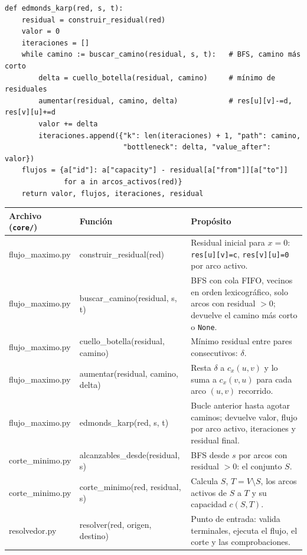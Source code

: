 \documentclass[12pt, a4paper]{article}
\begin{document}
\begin{lstlisting}
def edmonds_karp(red, s, t):
    residual = construir_residual(red)
    valor = 0
    iteraciones = []
    while camino := buscar_camino(residual, s, t):   # BFS, camino más corto
        delta = cuello_botella(residual, camino)     # mínimo de residuales
        aumentar(residual, camino, delta)            # res[u][v]-=d, res[v][u]+=d
        valor += delta
        iteraciones.append({"k": len(iteraciones) + 1, "path": camino,
                            "bottleneck": delta, "value_after": valor})
    flujos = {a["id"]: a["capacity"] - residual[a["from"]][a["to"]]
              for a in arcos_activos(red)}
    return valor, flujos, iteraciones, residual
\end{lstlisting}

\begin{table}[H]
  \centering
  \small
  \begin{tabular}{>{\ttfamily\raggedright\arraybackslash}p{3.0cm}>{\ttfamily\raggedright\arraybackslash}p{4.4cm}p{6.0cm}}
    \toprule
    \textnormal{\textbf{Archivo (\texttt{core/})}} & \textnormal{\textbf{Función}} & \textbf{Propósito} \\
    \midrule
    flujo\_maximo.py & construir\_residual(red) & Residual inicial para $x=0$: \texttt{res[u][v]=c}, \texttt{res[v][u]=0} por arco activo. \\
    flujo\_maximo.py & buscar\_camino(residual, s, t) & BFS con cola FIFO, vecinos en orden lexicográfico, solo arcos con residual $>0$; devuelve el camino más corto o \texttt{None}. \\
    flujo\_maximo.py & cuello\_botella(\allowbreak residual, camino) & Mínimo residual entre pares consecutivos: $\delta$. \\
    flujo\_maximo.py & aumentar(residual, camino, delta) & Resta $\delta$ a $c_x(u,v)$ y lo suma a $c_x(v,u)$ para cada arco $(u,v)$ recorrido. \\
    flujo\_maximo.py & edmonds\_karp(red, s, t) & Bucle anterior hasta agotar caminos; devuelve valor, flujo por arco activo, iteraciones y residual final. \\
    corte\_minimo.py & alcanzables\_\allowbreak desde(\allowbreak residual, s) & BFS desde $s$ por arcos con residual $>0$: el conjunto $S$. \\
    corte\_minimo.py & corte\_minimo(red, residual, s) & Calcula $S$, $T=V\setminus S$, los arcos activos de $S$ a $T$ y su capacidad $c(S,T)$. \\
    resolvedor.py & resolver(red, origen, destino) & Punto de entrada: valida terminales, ejecuta el flujo, el corte y las comprobaciones. \\

\end{tabular}
\end{table}
\end{document}
